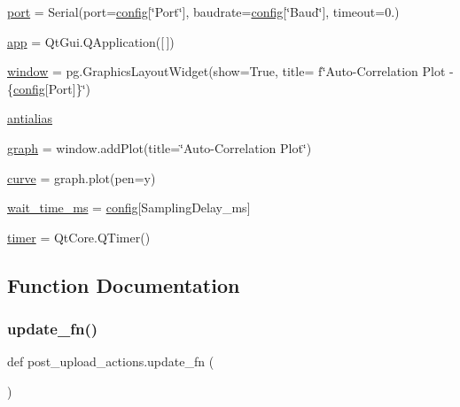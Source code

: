 \begin{DoxyCompactItemize}
\hyperlink{namespacepost__upload__actions_a93beac961ecb11f5cd375de68d537536}{port} = Serial(port=\hyperlink{namespacepost__upload__actions_accb09cfbbad171dde59d37a322e7d426}{config}\mbox{[}\char`\"{}Port\char`\"{}\mbox{]}, baudrate=\hyperlink{namespacepost__upload__actions_accb09cfbbad171dde59d37a322e7d426}{config}\mbox{[}\char`\"{}Baud\char`\"{}\mbox{]}, timeout=0.)
\item 
\hyperlink{namespacepost__upload__actions_aa34f3f575b899b8e81ca18407b45eef7}{app} = Qt\+Gui.\+Q\+Application(\mbox{[}$\,$\mbox{]})
\item 
\hyperlink{namespacepost__upload__actions_a6cf065c9f8b86253545865d6e0a2a879}{window} = pg.\+Graphics\+Layout\+Widget(show=True, title= f\char`\"{}Auto-\/Correlation Plot -\/ \{\hyperlink{namespacepost__upload__actions_accb09cfbbad171dde59d37a322e7d426}{config}\mbox{[}\textquotesingle{}Port\textquotesingle{}\mbox{]}\}\char`\"{})
\item 
\hyperlink{namespacepost__upload__actions_a794b55b7fa3378176059f54fbf9b3b51}{antialias}
\item 
\hyperlink{namespacepost__upload__actions_a8296d2fcc016826c1f0cff7c58dbd49d}{graph} = window.\+add\+Plot(title=\char`\"{}Auto-\/Correlation Plot\char`\"{})
\item 
\hyperlink{namespacepost__upload__actions_aed0ea70905ed0bebf27087552b59f95c}{curve} = graph.\+plot(pen=\textquotesingle{}y\textquotesingle{})
\item 
\hyperlink{namespacepost__upload__actions_a48e3e214dacb2b33e0ac69daa02e824a}{wait\+\_\+time\+\_\+ms} = \hyperlink{namespacepost__upload__actions_accb09cfbbad171dde59d37a322e7d426}{config}\mbox{[}\textquotesingle{}Sampling\+Delay\+\_\+ms\textquotesingle{}\mbox{]}
\item 
\hyperlink{namespacepost__upload__actions_a2fb797e73ff270f11d2e2e5b67c23333}{timer} = Qt\+Core.\+Q\+Timer()
\end{DoxyCompactItemize}


\subsection{Function Documentation}
\mbox{\label{namespacepost__upload__actions_ae4fafb438c9b8b9c81fadfd36e414dbe}} 
\subsubsection{\texorpdfstring{update\+\_\+fn()}{update\_fn()}}
{\footnotesize\ttfamily def post\+\_\+upload\+\_\+actions.\+update\+\_\+fn (\begin{DoxyParamCaption}{ }\end{DoxyParamCaption})}



